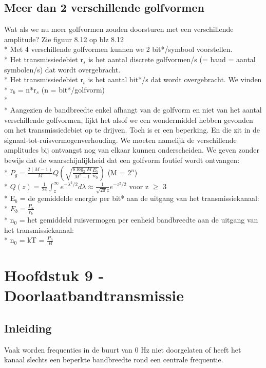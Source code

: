 \documentclass[10pt]{article}
\begin{document}
\subsection{Meer dan 2 verschillende golfvormen}
Wat als we nu meer golfvormen zouden doorsturen met een verschillende amplitude? {\scriptsize Zie figuur 8.12 op blz 8.12}\\*
Met 4 verschillende golfvormen kunnen we 2 bit*/symbool voorstellen.\\*
Het transmissiedebiet r$_s$ is het aantal discrete golfvormen/s (= baud = aantal symbolen/s) dat wordt overgebracht.\\*
Het transmissiedebiet r$_b$ is het aantal bit*/s dat wordt overgebracht. We vinden\\*
r$_b$ = n*r$_s$ {\scriptsize (n = bit*/golfvorm)}\\*\\*
Aangezien de bandbreedte enkel afhangt van de golfvorm en niet van het aantal verschillende golfvormen, lijkt het alsof we een wondermiddel hebben gevonden om het transmissiedebiet op te drijven. Toch is er een beperking. En die zit in de signaal-tot-ruisvermogenverhouding. We moeten namelijk de verschillende amplitudes bij ontvangst nog van elkaar kunnen onderscheiden. We geven zonder bewijs dat de waarschijnlijkheid dat een golfvorm foutief wordt ontvangen:\\*
$P_g=\frac{2(M-1)}{M}Q\left(\sqrt{\frac{6\log_2{M}}{M^2-1}\frac{E_b}{n_0}}\right)$ {\scriptsize (M = 2$^n$)}\\*
$Q(z) = \frac{1}{2\pi}\int_z^\infty{e^{-\lambda^2/2}d\lambda} \approx \frac{1}{\sqrt{2\pi}z}e^{-z^2/2}$ voor z $\geq$ 3\\*
E$_b$ = de gemiddelde energie per bit* aan de uitgang van het transmissiekanaal:\\*
$E_b = \frac{P_u}{r_b}$\\*
n$_0$ = het gemiddeld ruisvermogen per eenheid bandbreedte aan de uitgang van het transmissiekanaal:\\*
n$_0$ = kT = $\frac{P_n}{B}$
\section{Hoofdstuk 9 - Doorlaatbandtransmissie}
\subsection{Inleiding}
Vaak worden frequenties in de buurt van 0 Hz niet doorgelaten of heeft het kanaal slechts een beperkte bandbreedte rond een centrale frequentie.
\end{document}
